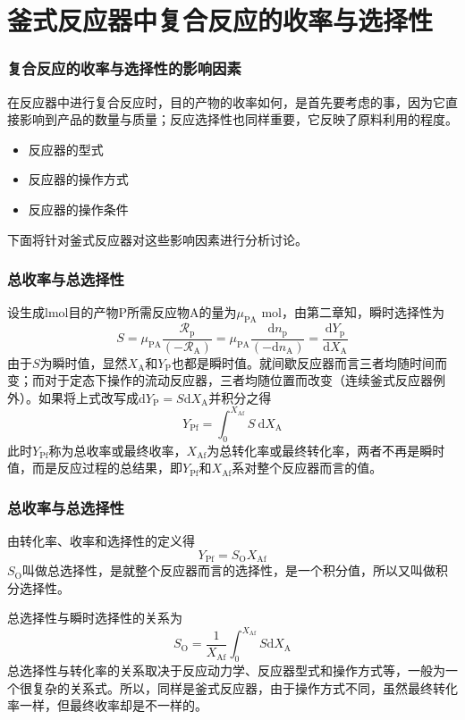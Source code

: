 \section{釜式反应器中复合反应的收率与选择性}


\begin{frame}
    \frametitle{复合反应的收率与选择性的影响因素}

    \large 在反应器中进行复合反应时，目的产物的收率如何，是首先要考虑的事，因为它直接影响到产品的数量与质量；反应选择性也同样重要，它反映了原料利用的程度。
    
    \begin{itemize}
        \item[\bullet] 反应器的型式
        \item[\bullet] 反应器的操作方式
        \item[\bullet] 反应器的操作条件
    \end{itemize}
    下面将针对釜式反应器对这些影响因素进行分析讨论。

\end{frame}


\begin{frame}
    \frametitle{总收率与总选择性}

    设生成lmol目的产物P所需反应物A的量为$\mu_\mathrm{PA}$ mol，由第二章知，瞬时选择性为
    \[
        S=\mu_{\mathrm{PA}} \frac{\mathscr{R}_{\mathrm{p}}}{(-\mathscr{R}_{\mathrm{A}})}=\mu_{\mathrm{PA}} \frac{\mathrm{d} n_{\mathrm{p}}}{(-\mathrm{d} n_{\mathrm{A}})}=\frac{\mathrm{d} Y_{\mathrm{p}}}{\mathrm{d} X_{\mathrm{A}}}
    \]
    由于$S$为瞬时值，显然$X_\mathrm{A}$和$Y_\mathrm{P}$也都是瞬时值。就间歇反应器而言三者均随时间而变；而对于定态下操作的流动反应器，三者均随位置而改变（连续釜式反应器例外）。如果将上式改写成$\mathrm{d}Y_\mathrm{P}=S\mathrm{d}X_\mathrm{A}$并积分之得
    \[
        Y_{\mathrm{Pf}}=\int_{0}^{X_{\mathrm{Af}}} S \mathrm{~d} X_{\mathrm{A}}
    \]
    此时$Y_{\mathrm{Pf}}$称为总收率或最终收率，$X_{\mathrm{Af}}$为总转化率或最终转化率，两者不再是瞬时值，而是反应过程的总结果，即$Y_{\mathrm{Pf}}$和$X_{\mathrm{Af}}$系对整个反应器而言的值。
\end{frame}


\begin{frame}
    \frametitle{总收率与总选择性}

    由转化率、收率和选择性的定义得
    \[
        Y_{\mathrm{Pf}}=S_\mathrm{O}X_{\mathrm{Af}}
    \]
    $S_\mathrm{O}$叫做总选择性，是就整个反应器而言的选择性，是一个积分值，所以又叫做积分选择性。

    总选择性与瞬时选择性的关系为
    \[
        S_\mathrm{O}=\frac{1}{X_{\mathrm{Af}}}\int_0^{X_{\mathrm{Af}}}S\mathrm{d}X_{\mathrm{A}}
    \]
    总选择性与转化率的关系取决于反应动力学、反应器型式和操作方式等，一般为一个很复杂的关系式。所以，同样是釜式反应器，由于操作方式不同，虽然最终转化率一样，但最终收率却是不一样的。

\end{frame}


